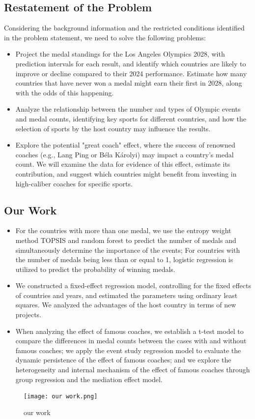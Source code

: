 \documentclass{mcmthesis}  %
\begin{document}
\subsection{Restatement of the Problem}  %
\hspace*{1.5em}Considering the background information and the restricted conditions identified in the problem statement, we need to solve the following problems:
\begin{itemize}  %
\item Project the medal standings for the Los Angeles Olympics 2028, with prediction intervals for each result, and identify which countries are likely to improve or decline compared to their 2024 performance. Estimate how many countries that have never won a medal might earn their first in 2028, along with the odds of this happening.
\item Analyze the relationship between the number and types of Olympic events and medal counts, identifying key sports for different countries, and how the selection of sports by the host country may influence the results.
\item Explore the potential "great coach" effect, where the success of renowned coaches (e.g., Lang Ping or Béla Károlyi) may impact a country's medal count. We will examine the data for evidence of this effect, estimate its contribution, and suggest which countries might benefit from investing in high-caliber coaches for specific sports.
\end{itemize}  %

\subsection{Our Work}  %

\begin{itemize}  %
\item For the countries with more than one medal, we use the entropy weight method TOPSIS and random forest to predict the number of medals and simultaneously determine the importance of the events; For countries with the number of medals being less than or equal to 1, logistic regression is utilized to predict the probability of winning medals.
\item We constructed a fixed-effect regression model, controlling for the fixed effects of countries and years, and estimated the parameters using ordinary least squares. We analyzed the advantages of the host country in terms of new projects.
\item When analyzing the effect of famous coaches, we establish a t-test model to compare the differences in medal counts between the cases with and without famous coaches; we apply the event study regression model to evaluate the dynamic persistence of the effect of famous coaches; and we explore the heterogeneity and internal mechanism of the effect of famous coaches through group regression and the mediation effect model.
\end{itemize}  %
\begin{figure}[H]  %
\small
\centering  %
\texttt{[image: our work.png]}  %
\caption{our work} 
\end{figure}  %
\end{document}
